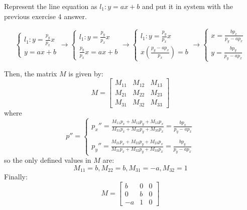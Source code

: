 \documentclass{article}
\begin{document}
Represent the line equation as $l_1 : y = ax + b$ and put it in system with the previous exercise $4$ answer.

\begin{equation*}
    \begin{cases}
        l_1: y = \frac{p_y}{p_x} x \\
        y = ax + b
    \end{cases}
    \rightarrow
    \begin{cases}
        l_1: y = \frac{p_y}{p_x} x \\
        \frac{p_y}{p_x} x = ax + b
    \end{cases}
    \rightarrow
    \begin{cases}
        l_1: y = \frac{p_y}{p_x} x \\
        x (\frac{p_y - a p_x}{p_x}) = b
    \end{cases}
    \rightarrow
    \begin{cases}
        x = \frac{bp_x}{p_y - ap_x} \\
        y = \frac{bp_y}{p_y - ap_x}
    \end{cases}
\end{equation*}

Then, the matrix $M$ is given by:
\[
    M =
    \begin{bmatrix}
        M_{11} & M_{12} & M_{13} \\
        M_{21} & M_{22} & M_{23} \\
        M_{31} & M_{32} & M_{33}
    \end{bmatrix}
\]
where
\begin{equation*}
    p'' =
    \begin{cases}
        p_x'' = \frac{M_{11}p_x + M_{12}p_y + M_{13}p_x}{M_{31}p_x + M_{32}p_y + M_{33}p_x} = \frac{bp_x}{p_y - ap_x} \\\\
        p_y'' = \frac{M_{21}p_x + M_{22}p_y + M_{23}p_x}{M_{31}p_x + M_{32}p_y + M_{33}p_x} = \frac{bp_y}{p_y - ap_x}
    \end{cases}
\end{equation*}
so the only defined values in $M$ are:
\[
    M_{11} = b, M_{22} = b, M_{31} = -a, M_{32} = 1
\]
Finally:
\[
    M =
    \begin{bmatrix}
        b  & 0 & 0 \\
        0  & b & 0 \\
        -a & 1 & 0
    \end{bmatrix}
\]
\end{document}
